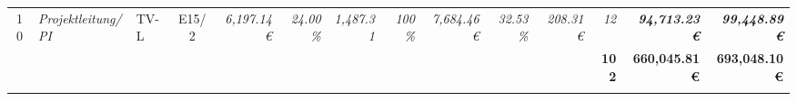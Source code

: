 \begin{table}[]
\begin{tabular}{clllcrrrrrrrrrr}
10                                                                                      & \multicolumn{2}{l}{\cellcolor[HTML]{FFFF99}\textit{Projektleitung/PI}}                & \cellcolor[HTML]{FFFF99}TV-L      & \cellcolor[HTML]{FFFF99}E15/2                & \cellcolor[HTML]{FFFF99}\textit{6,197.14 €}         & \textit{24.00\%}                                      & \textit{1,487.31}                            & \cellcolor[HTML]{FFFF99}\textit{100\%}                  & \cellcolor[HTML]{92D050}\textit{7,684.46 €}  & \cellcolor[HTML]{FFFF99}\textit{32.53\%}       & \cellcolor[HTML]{92D050}\textit{208.31 €}    & \cellcolor[HTML]{FFFF99}\textit{12}          & \cellcolor[HTML]{BFBFBF}\textit{\textbf{94,713.23 €}}           & \textit{\textbf{99,448.89 €}}                                                                 \\
\rowcolor[HTML]{0070C0} 
\multicolumn{1}{l}{\cellcolor[HTML]{0070C0}{\color[HTML]{FFFFFF} \textbf{Gesamtsumme}}} &                                                         &                             &                                   & \multicolumn{1}{l}{\cellcolor[HTML]{0070C0}} & \multicolumn{1}{l}{\cellcolor[HTML]{0070C0}}        & \multicolumn{1}{l}{\cellcolor[HTML]{0070C0}}          & \multicolumn{1}{l}{\cellcolor[HTML]{0070C0}} & \multicolumn{1}{l}{\cellcolor[HTML]{0070C0}}            & \multicolumn{1}{l}{\cellcolor[HTML]{0070C0}} & \multicolumn{1}{l}{\cellcolor[HTML]{0070C0}}   & \multicolumn{1}{l}{\cellcolor[HTML]{0070C0}} & {\color[HTML]{FFFFFF} \textbf{102}}          & {\color[HTML]{FFFFFF} \textbf{660,045.81 €}}                    & {\color[HTML]{FFFFFF} \textbf{693,048.10 €}}                                                  \\
\multicolumn{1}{l}{}                                                                    &                                                         &                             &                                   & \multicolumn{1}{l}{}                         & \multicolumn{1}{l}{}                                & \multicolumn{1}{l}{}                                  & \multicolumn{1}{l}{}                         & \multicolumn{1}{l}{}                                    & \multicolumn{1}{l}{}                         & \multicolumn{1}{l}{}                           & \multicolumn{1}{l}{}                         & \multicolumn{1}{l}{}                         & \multicolumn{1}{l}{}                                            & \multicolumn{1}{l}{}                                                                          \\

\end{tabular}
\end{table}
